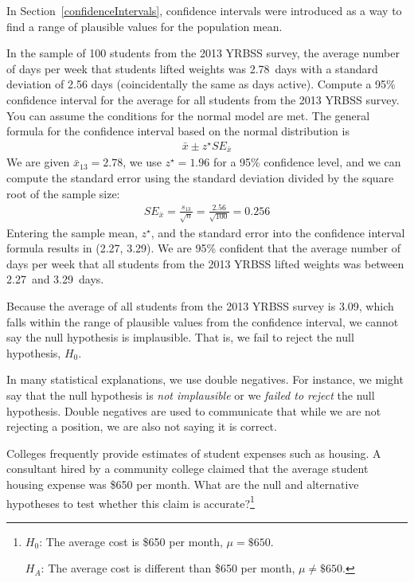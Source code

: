 In Section~\ref{confidenceIntervals}, confidence intervals were introduced as a way to find a range of plausible values for the population mean.

\begin{example}{In the sample of 100 students from the 2013 YRBSS survey, the average number of days per week that students lifted weights was 2.78~days with a standard deviation of 2.56 days (coincidentally the same as days active). Compute a 95\% confidence interval for the average for all students from the 2013 YRBSS survey. You can assume the conditions for the normal model are met.}
The general formula for the confidence interval based on the normal distribution is
\begin{align*}
\bar{x} \pm z^{\star} SE_{\bar{x}}
\end{align*}
We are given $\bar{x}_{13} = 2.78$, we use $z^{\star} = 1.96$ for a 95\% confidence level, and we can compute the standard error using the standard deviation divided by the square root of the sample size:
\begin{align*}
SE_{\bar{x}} = \frac{s_{13}}{\sqrt{n}} = \frac{2.56}{\sqrt{100}} = 0.256
\end{align*}
Entering the sample mean, $z^{\star}$, and the standard error into the confidence interval formula results in (2.27, 3.29). We are 95\% confident that the average number of days per week that all students from the 2013 YRBSS lifted weights was between 2.27~and 3.29~days.
\end{example}

Because the average of all students from the 2013 YRBSS survey is 3.09, which falls within the range of plausible values from the confidence interval, we cannot say the null hypothesis is implausible. That is, we fail to reject the null hypothesis, $H_0$.

\begin{tipBox}{
In many statistical explanations, we use double negatives. For instance, we might say that the null hypothesis is \emph{not implausible} or we \emph{failed to reject} the null hypothesis. Double negatives are used to communicate that while we are not rejecting a position, we are also not saying it is correct.}
\end{tipBox}

\begin{exercise} \label{htForHousingExpenseForCommunityCollege650}
Colleges frequently provide estimates of student expenses such as housing. A consultant hired by a community college claimed that the average student housing expense was \$650 per month. What are the null and alternative hypotheses to test whether this claim is accurate?\footnote{$H_0$: The average cost is \$650 per month, $\mu = \$650$.

\hspace{3.4mm}$H_A$: The average cost is different than \$650 per month, $\mu \neq \$650$.}
\end{exercise}

